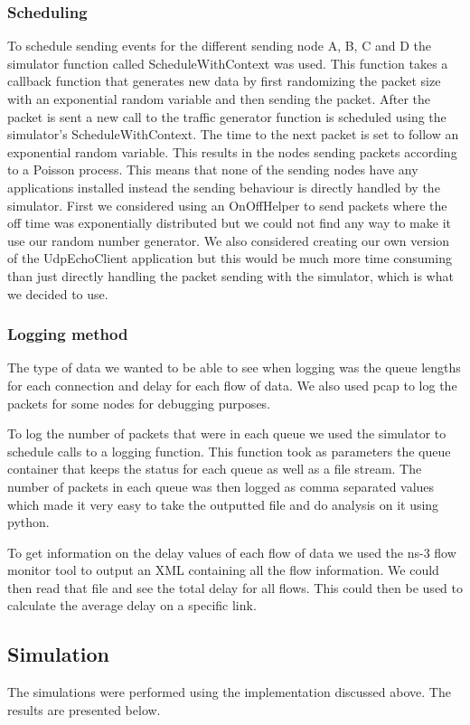 \documentclass{article}
\begin{document}
\subsubsection{Scheduling}
To schedule sending events for the different sending node A, B, C and D the simulator function called ScheduleWithContext was used.
This function takes a callback function that generates new data by first randomizing the packet size with an exponential random variable and then sending the packet.
After the packet is sent a new call to the traffic generator function is scheduled using the simulator's ScheduleWithContext.
The time to the next packet is set to follow an exponential random variable.
This results in the nodes sending packets according to a Poisson process.
This means that none of the sending nodes have any applications installed instead the sending behaviour is directly handled by the simulator.
First we considered using an OnOffHelper to send packets where the off time was exponentially distributed but we could not find any way to make it use our random number generator.
We also considered creating our own version of the UdpEchoClient application but this would be much more time consuming than just directly handling the packet sending with the simulator, which is what we decided to use.

\subsubsection{Logging method}
The type of data we wanted to be able to see when logging was the queue lengths for each connection and delay for each flow of data.
We also used pcap to log the packets for some nodes for debugging purposes.

To log the number of packets that were in each queue we used the simulator to schedule calls to a logging function.
This function took as parameters the queue container that keeps the status for each queue as well as a file stream.
The number of packets in each queue was then logged as comma separated values which made it very easy to take the outputted file and do analysis on it using python.

To get information on the delay values of each flow of data we used the ns-3 flow monitor tool to output an XML containing all the flow information.
We could then read that file and see the total delay for all flows.
This could then be used to calculate the average delay on a specific link.

\subsection{Simulation}
The simulations were performed using the implementation discussed above.
The results are presented below.
\end{document}
